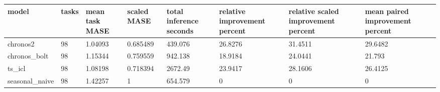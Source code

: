 \begin{tabular}{llllllll}
\toprule
model & tasks & mean task MASE & scaled MASE & total inference seconds & relative improvement percent & relative scaled improvement percent & mean paired improvement percent \\
\midrule
chronos2 & 98 & 1.04093 & 0.685489 & 439.076 & 26.8276 & 31.4511 & 29.6482 \\
chronos\_bolt & 98 & 1.15344 & 0.759559 & 942.138 & 18.9184 & 24.0441 & 21.793 \\
ts\_icl & 98 & 1.08198 & 0.718394 & 2672.49 & 23.9417 & 28.1606 & 26.4125 \\
seasonal\_naive & 98 & 1.42257 & 1 & 654.579 & 0 & 0 & 0 \\
\bottomrule
\end{tabular}
